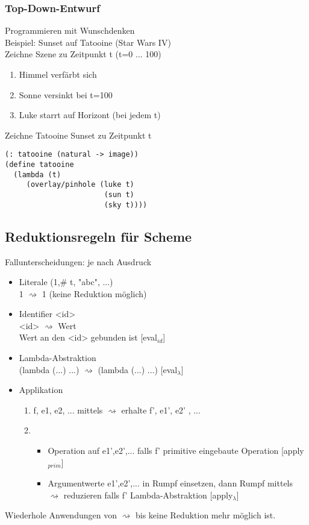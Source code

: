 \documentclass[paper=a4, fontsize=11pt]{scrartcl}
\numberwithin{equation}{section}
\numberwithin{figure}{section}
\numberwithin{table}{section}
\begin{document}
\subsubsection{Top-Down-Entwurf}
Programmieren mit Wunschdenken \\

Beispiel: Sunset auf Tatooine (Star Wars IV) \\
Zeichne Szene zu Zeitpunkt t (t=0 ... 100) 
\begin{enumerate}
\item Himmel verfärbt sich
\item Sonne versinkt bei t=100
\item Luke starrt auf Horizont (bei jedem t)
\end{enumerate}
Zeichne Tatooine Sunset zu Zeitpunkt t
\begin{lstlisting}
(: tatooine (natural -> image))
(define tatooine
  (lambda (t)
     (overlay/pinhole (luke t)
                       (sun t)
                       (sky t))))
\end{lstlisting}
\subsection{Reduktionsregeln für Scheme}
Fallunterscheidungen: je nach Ausdruck 
\begin{itemize}
\item Literale (1,\# t, "abc", ...) \\
         1 $\rightsquigarrow$ 1 (keine Reduktion möglich)
\item Identifier <id>\\
         <id> $\rightsquigarrow$ Wert \\
         Wert an den <id> gebunden ist [eval$_{id}$]
\item Lambda-Abstraktion \\
         (lambda (...) ...) $\rightsquigarrow$ (lambda (...) ...) [eval$_{\lambda}$]
\item Applikation                  
         \begin{enumerate}
         \item f, e1, e2, ... mittels $\rightsquigarrow$ erhalte f', e1', e2' , ...
         \item \begin{itemize}
                  \item Operation auf e1',e2',... falls f' primitive eingebaute Operation [apply$_{prim}$]
                  \item Argumentwerte e1',e2',... in Rumpf einsetzen, dann Rumpf mittels $\rightsquigarrow$ reduzieren falls f' Lambda-Abstraktion [apply$_{\lambda}$]         
                  \end{itemize}
         \end{enumerate}
\end{itemize}
Wiederhole Anwendungen von $\rightsquigarrow$ bis keine Reduktion mehr möglich ist. \\
\end{document}
